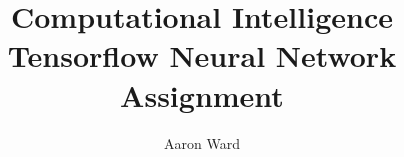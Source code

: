 \documentclass[12pt,ITBthesis]{report}
\begin{document}
\makeatletter
\renewcommand\listoffigures{%
        \@starttoc{lot}%
}
\makeatother

\makeatletter
\renewcommand\listoftables{%
        \@starttoc{lot}%
}
\makeatother

\makeatletter
\renewcommand\appendix{%
 \par
 \setcounter{chapter}{0}%
 \setcounter{section}{0}%
 \setcounter{subsection}{0}%
 \gdef\thesection{\@Alph\c@section}
 \gdef\@sect##1##2##3##4##5##6[##7]##8{%
  \refstepcounter{##1}%
  \protected@edef\@svsec{\@seccntformat{##1}\relax}%
  \begingroup
    \hspace{-\parindent}##6\appendixname~ {%
    \@hangfrom{\hskip ##3 \relax\@svsec}\par%
    \hspace{-\parindent}\interlinepenalty \@M ##8 \@@par}%
  \endgroup
  \csname ##1mark\endcsname{##7}%
  \addcontentsline{toc}{##1}{\protect\numberline{\csname the##1\endcsname}##7}%
  \@xsect{##5}%
 }%
}%
\makeatother

\setlength{\parskip}{1ex plus 0.5ex minus 0.2ex}


\title{Computational Intelligence Tensorflow Neural Network Assignment}

\author{Aaron Ward}



\address{Dublin, Ireland }

\supervisor{}





%

\setcounter{page}{1} \beforepreface




%



\afterpreface
\def\baselinestretch{1}
\end{document}

